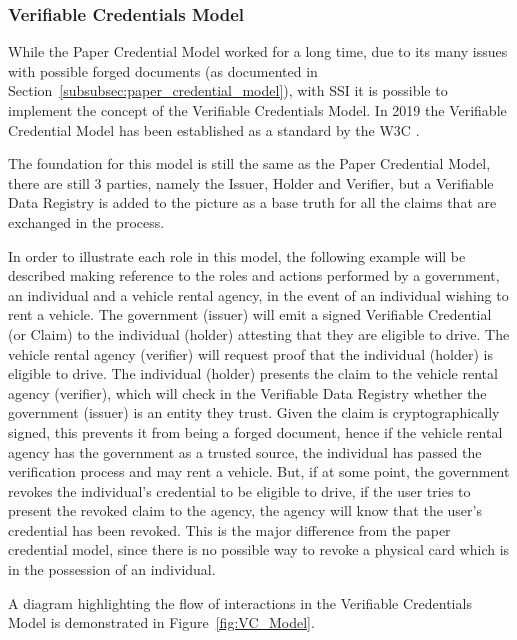 \subsubsection{Verifiable Credentials Model}
\label{subsubsec:verifiable_credential_model}

While the Paper Credential Model worked for a long time, due to its many issues with possible forged documents (as documented in Section~\ref{subsubsec:paper_credential_model}), with SSI it is possible to implement the concept of the Verifiable Credentials Model. In 2019 the Verifiable Credential Model has been established as a standard by the W3C \cite{Zundel:19:VCD} \cite{kortesniemi2019improving}.

The foundation for this model is still the same as the Paper Credential Model, there are still 3 parties, namely the Issuer, Holder and Verifier, but a Verifiable Data Registry is added to the picture as a base truth for all the claims that are exchanged in the process.

In order to illustrate each role in this model, the following example will be described making reference to the roles and actions performed by a government, an individual and a vehicle rental agency, in the event of an individual wishing to rent a vehicle. 
The government (issuer) will emit a signed Verifiable Credential (or Claim) to the individual (holder) attesting that they are eligible to drive. The vehicle rental agency (verifier) will request proof that the individual (holder) is eligible to drive. The individual (holder) presents the claim to the vehicle rental agency (verifier), which will check in the Verifiable Data Registry whether the government (issuer) is an entity they trust. Given the claim is cryptographically signed, this prevents it from being a forged document, hence if the vehicle rental agency has the government as a trusted source, the individual has passed the verification process and may rent a vehicle. But, if at some point, the government revokes the individual's credential to be eligible to drive, if the user tries to present the revoked claim to the agency, the agency will know that the user's credential has been revoked. This is the major difference from the paper credential model, since there is no possible way to revoke a physical card which is in the possession of an individual.

A diagram highlighting the flow of interactions in the Verifiable Credentials Model is demonstrated in Figure~\ref{fig:VC_Model}.

